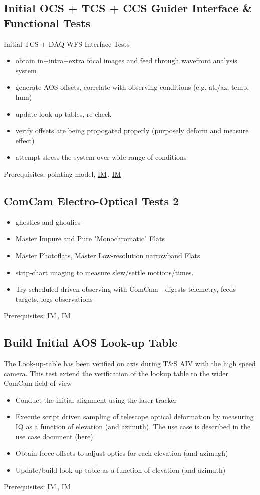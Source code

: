 \documentclass[SE,authoryear,toc]{lsstdoc}
\newcommand{\IM}[1]{\hyperref[IM:#1]{\color{blue}IM$_{\text{\csname nameIM#1\endcsname}}$}}
\begin{document}
\subsection{Initial OCS + TCS + CCS Guider Interface \& Functional Tests}

Initial TCS + DAQ WFS Interface Tests
\begin{itemize}
\item obtain in+intra+extra focal images and feed through wavefront analysis system
\item generate AOS offsets, correlate with observing conditions (e.g. atl/az, temp, hum)
\item update look up tables, re-check
\item verify offsets are being propogated properly (purposely deform and measure effect)
\item attempt stress the system over wide range of conditions
\end{itemize}
Prerequisites: pointing model, \IM{b}, \IM{g}
  
\subsection{ComCam Electro-Optical Tests 2}

\begin{itemize}
\item ghosties and ghoulies
\item Master Impure and Pure "Monochromatic" Flats
\item Master Photoflats, Master Low-resolution narrowband Flats
\item strip-chart imaging to measure slew/settle motions/times.
\item Try scheduled driven observing with ComCam - digests telemetry, feeds targets, logs observations
\end{itemize}
Prerequisites: \IM{b}, \IM{g}

\subsection{Build Initial AOS Look-up Table}

The Look-up-table has been verified on axis during T\&S AIV with the high speed camera. This test extend the verification of the lookup table to the wider ComCam field of view

\begin{itemize}
\item Conduct the initial alignment using the laser tracker
\item Execute script driven sampling of telescope optical deformation by measuring IQ as a function of elevation (and azimuth). The use case is described in the use case document (here)
\item Obtain force offsets to adjust optics for each elevation (and azimugh)
\item Update/build look up table as a function of elevation (and azimuth)
\end{itemize}
Prerequisites: \IM{b}, \IM{g}
\end{document}
